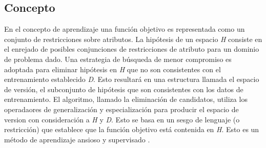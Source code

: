 \subsection{Concepto}

En el concepto de aprendizaje una función objetivo es representada como un conjunto de restricciones sobre atributos. La hipótesis de un espacio \textit{H} consiste en el enrejado de posibles conjunciones de restricciones de atributo para un dominio de problema dado. Una estrategia de búsqueda de menor compromiso es adoptada para eliminar hipótesis en \textit{H} que no son consistentes con el entrenamiento establecido \textit{D}. Esto resultará en una estructura llamada el espacio de versión, el subconjunto de hipótesis que son consistentes con los datos de entrenamiento. El algoritmo, llamado la eliminación de candidatos, utiliza los operadaores de generalización y especialización para producir el espacio de version con consideración a \textit{H} y \textit{D}. Esto se basa en un sesgo de lenguaje (o restricción) que establece que la función objetivo está contenida en \textit{H}. Esto es un método de aprendizaje ansioso y supervisado \cite{defmach}.\\